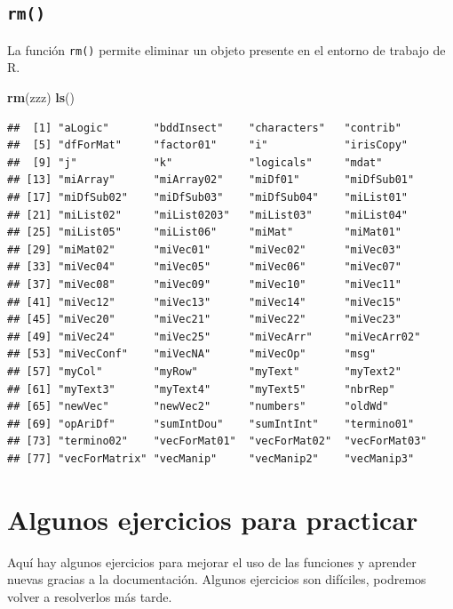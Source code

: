 \documentclass[]{book}
\newenvironment{Shaded}{\begin{snugshade}}{\end{snugshade}}
\newcommand{\KeywordTok}[1]{\textcolor[rgb]{0.13,0.29,0.53}{\textbf{#1}}}
\newcommand{\NormalTok}[1]{#1}
\begin{document}
\subsection{\texorpdfstring{\texttt{rm()}}{rm()}}\label{l015rm}

La función \texttt{rm()} permite eliminar un objeto presente en el
entorno de trabajo de R.

\begin{Shaded}
\begin{Highlighting}[]
\KeywordTok{rm}\NormalTok{(zzz)}
\KeywordTok{ls}\NormalTok{()}
\end{Highlighting}
\end{Shaded}

\begin{verbatim}
##  [1] "aLogic"       "bddInsect"    "characters"   "contrib"     
##  [5] "dfForMat"     "factor01"     "i"            "irisCopy"    
##  [9] "j"            "k"            "logicals"     "mdat"        
## [13] "miArray"      "miArray02"    "miDf01"       "miDfSub01"   
## [17] "miDfSub02"    "miDfSub03"    "miDfSub04"    "miList01"    
## [21] "miList02"     "miList0203"   "miList03"     "miList04"    
## [25] "miList05"     "miList06"     "miMat"        "miMat01"     
## [29] "miMat02"      "miVec01"      "miVec02"      "miVec03"     
## [33] "miVec04"      "miVec05"      "miVec06"      "miVec07"     
## [37] "miVec08"      "miVec09"      "miVec10"      "miVec11"     
## [41] "miVec12"      "miVec13"      "miVec14"      "miVec15"     
## [45] "miVec20"      "miVec21"      "miVec22"      "miVec23"     
## [49] "miVec24"      "miVec25"      "miVecArr"     "miVecArr02"  
## [53] "miVecConf"    "miVecNA"      "miVecOp"      "msg"         
## [57] "myCol"        "myRow"        "myText"       "myText2"     
## [61] "myText3"      "myText4"      "myText5"      "nbrRep"      
## [65] "newVec"       "newVec2"      "numbers"      "oldWd"       
## [69] "opAriDf"      "sumIntDou"    "sumIntInt"    "termino01"   
## [73] "termino02"    "vecForMat01"  "vecForMat02"  "vecForMat03" 
## [77] "vecForMatrix" "vecManip"     "vecManip2"    "vecManip3"
\end{verbatim}

\section{Algunos ejercicios para
practicar}\label{algunos-ejercicios-para-practicar}

Aquí hay algunos ejercicios para mejorar el uso de las funciones y
aprender nuevas gracias a la documentación. Algunos ejercicios son
difíciles, podremos volver a resolverlos más tarde.
\end{document}
